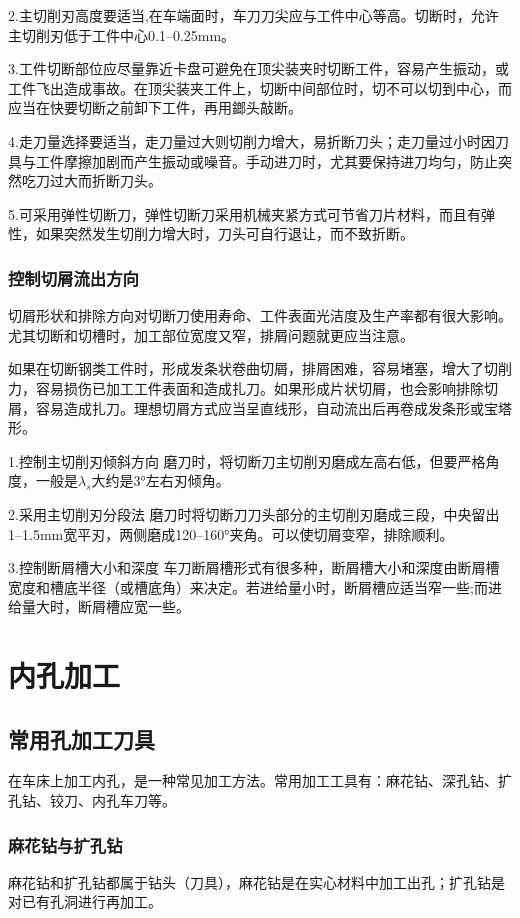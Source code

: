 \documentclass{ctexbook}
\begin{document}
2.主切削刃高度要适当,在车端面时，车刀刀尖应与工件中心等高。切断时，允许主切削刃低于工件中心0.1--0.25mm。

3.工件切断部位应尽量靠近卡盘可避免在顶尖装夹时切断工件，容易产生振动，或工件飞出造成事故。在顶尖装夹工件上，切断中间部位时，切不可以切到中心，而应当在快要切断之前卸下工件，再用鎯头敲断。

4.走刀量选择要适当，走刀量过大则切削力增大，易折断刀头；走刀量过小时因刀具与工件摩擦加剧而产生振动或噪音。手动进刀时，尤其要保持进刀均匀，防止突然吃刀过大而折断刀头。

5.可采用弹性切断刀，弹性切断刀采用机械夹紧方式可节省刀片材料，而且有弹性，如果突然发生切削力增大时，刀头可自行退让，而不致折断。
\subsubsection{控制切屑流出方向}
切屑形状和排除方向对切断刀使用寿命、工件表面光洁度及生产率都有很大影响。尤其切断和切槽时，加工部位宽度又窄，排屑问题就更应当注意。

如果在切断钢类工件时，形成发条状卷曲切屑，排屑困难，容易堵塞，增大了切削力，容易损伤已加工工件表面和造成扎刀。如果形成片状切屑，也会影响排除切屑，容易造成扎刀。理想切屑方式应当呈直线形，自动流出后再卷成发条形或宝塔形。

1.控制主切削刃倾斜方向 磨刀时，将切断刀主切削刃磨成左高右低，但要严格角度，一般是$\lambda_s$大约是3°左右刃倾角。

2.采用主切削刃分段法 磨刀时将切断刀刀头部分的主切削刃磨成三段，中央留出1--1.5mm宽平刃，两侧磨成120--160°夹角。可以使切屑变窄，排除顺利。

3.控制断屑槽大小和深度 车刀断屑槽形式有很多种，断屑槽大小和深度由断屑槽宽度和槽底半径（或槽底角）来决定。若进给量小时，断屑槽应适当窄一些;而进给量大时，断屑槽应宽一些。
\section{内孔加工}
\subsection{常用孔加工刀具}
在车床上加工内孔，是一种常见加工方法。常用加工工具有：麻花钻、深孔钻、扩孔钻、铰刀、内孔车刀等。
\subsubsection{麻花钻与扩孔钻}
麻花钻和扩孔钻都属于钻头（刀具），麻花钻是在实心材料中加工出孔；扩孔钻是对已有孔洞进行再加工。
\end{document}
